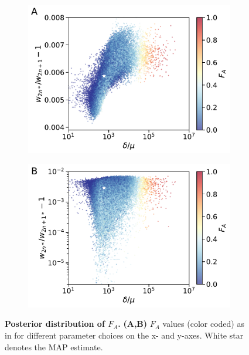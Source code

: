 \documentclass[12pt]{extarticle}
\begin{document}
\begin{figure}[p]
	\begin{subfigure}{0.5\textwidth}
      \centering
      \includegraphics[width=\textwidth]{../figures/F_A_delta-mu-ratio_1.pdf}      
	\end{subfigure}
	  \begin{subfigure}{0.5\textwidth}
      \centering
      \includegraphics[width=\textwidth]{../figures/F_A_delta-mu-ratio_2.pdf}
  \end{subfigure}
	\caption{\textbf{Posterior distribution of $F_A$.}
	\textbf{(A,B)} $F_A$ values (color coded) as in  for different parameter choices on the x- and y-axes. White star denotes the MAP estimate.
	}
    \label{fig:posterior_FA_supp}
\end{figure}
\end{document}
